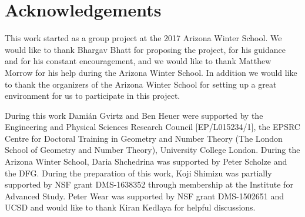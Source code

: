 \documentclass[10pt,oneside]{amsart}
\theoremstyle{definition}
\newtheorem{question}[theorem]{Question}
\newtheorem{example}[theorem]{Example}
\begin{document}
 \begin{comment}
Now we end the introduction by describing the content of each section. 

	\begin{question} \label{question_intro}
	    \begin{enumerate} 
	    \item		Given a rigid group $G$, when is there an adic space $G_\infty$ such that $G_\infty \sim  \varprojlim_{[p]} G ?$
	    \item If it exists, and $K$ is perfectoid, when is $G_\infty$ perfectoid?
	    \end{enumerate}
	\end{question}
 
 
	But before we give proofs for examples of rigid groups $G$ for which a perfectoid tilde-limit exists, we first note that the second question certainly doesn't have an affirmative answer for all rigid group varieties:
	\begin{example}
		For the additive group $\mathbb G_a^{\operatorname{an}}$, we know that $[p]$ is an isomorphism and therefore $\varprojlim_{[p]} \mathbb G_a=\mathbb G_a$ exists (even as an actual limit in the category of adic spaces) but is certainly not perfectoid.
	\end{example}

\end{comment} 
 
 
 
 \section*{Acknowledgements}
 This work started as a group project at the 2017 Arizona Winter School. We would like to thank Bhargav Bhatt for proposing the project, for his guidance and for his constant encouragement, and we would like to thank Matthew Morrow for his help during the Arizona Winter School. In addition we would like to thank the organizers of the Arizona Winter School for setting up a great environment for us to participate in this project. 
 
 During this work Dami\'an Gvirtz and Ben Heuer were supported by the Engineering and Physical Sciences Research Council [EP/L015234/1], the EPSRC Centre for Doctoral Training in Geometry and Number Theory (The London School of Geometry and Number Theory), University College London. 
 During the Arizona Winter School, Daria Shchedrina was supported by Peter Scholze and the DFG.
During the preparation of this work, Koji Shimizu was partially supported by NSF grant DMS-1638352 through membership at the Institute for Advanced Study.
 Peter Wear was supported by NSF grant DMS-1502651 and UCSD and would like to thank Kiran Kedlaya for helpful discussions.
\end{document}
